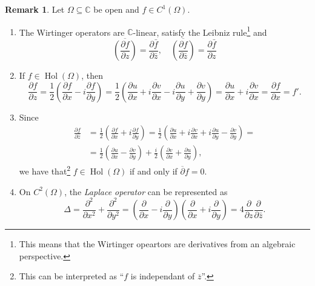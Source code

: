 \documentclass[letterpaper, 11pt]{article}
\newcommand{\C}{\mathbb{C}}
\newcommand{\1}{\mathds{1}}
\DeclareMathOperator*{\Hol}{Hol}
\theoremstyle{definition}
\newtheorem{remark}[theorem]{Remark}
\begin{document}
\begin{remark}
  Let $\Omega \subseteq \C$ be open and $f \in C^1(\Omega)$.
  \begin{enumerate}
    \item The Wirtinger operators are $\C$-linear, satisfy the Leibniz rule\footnote{This means that the Wirtinger opeartors are derivatives from an algebraic perspective.} and
    $$ \overline{\left( \frac{\partial f}{\partial z} \right)} = \frac{\partial \bar{f}}{\partial \bar{z}}, \quad \overline{\left( \frac{\partial f}{\partial \bar{z}} \right)} = \frac{\partial \bar{f}}{\partial z} $$
    \item If $f \in \Hol(\Omega)$, then
    $$
      \frac{\partial f}{\partial z} = \frac{1}{2} \left( \frac{\partial f}{\partial x} - i \frac{\partial f}{\partial y} \right) = \frac{1}{2} \left( \frac{\partial u}{\partial x} + i\frac{\partial v}{\partial x} - i\frac{\partial u}{\partial y} + \frac{\partial v}{\partial y} \right) = \frac{\partial u}{\partial x} + i \frac{\partial v}{\partial x} = \frac{\partial f}{\partial x} = f'.
    $$
    \item Since
    \begin{align*}      
      \frac{\partial f}{\partial \bar{z}} &= \frac{1}{2} \left( \frac{\partial f}{\partial x} + i \frac{\partial f}{\partial y} \right) = \frac{1}{2} \left( \frac{\partial u}{\partial x} + i\frac{\partial v}{\partial x} + i\frac{\partial u}{\partial y} - \frac{\partial v}{\partial y} \right) = \\
      &= \frac{1}{2} \left( \frac{\partial u}{\partial x} - \frac{\partial v}{\partial y} \right) + \frac{i}{2} \left( \frac{\partial v}{\partial x} + \frac{\partial u}{\partial y} \right),
    \end{align*}
    we have that\footnote{This can be interpreted as ``$f$ is independant of $\overline{z}$''.} $f \in \Hol(\Omega)$ if and only if $\overline{\partial}f = 0$.
    \item On $C^2(\Omega)$, the \emph{Laplace operator} can be represented as
    $$ \Delta = \frac{\partial^2}{\partial x^2} + \frac{\partial^2}{\partial y^2} = \left( \frac{\partial}{\partial x} - i \frac{\partial}{\partial y} \right) \left( \frac{\partial}{\partial x} + i \frac{\partial}{\partial y} \right) = 4 \frac{\partial}{\partial z} \frac{\partial}{\partial \bar{z}}. $$
  \end{enumerate}
\end{remark}
\end{document}
